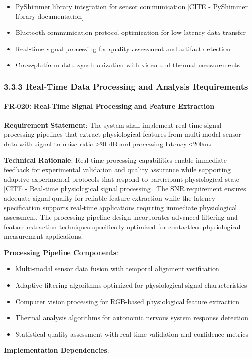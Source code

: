 \documentclass[12pt,a4paper]{article}
\begin{document}
\begin{itemize}
\item PyShimmer library integration for sensor communication [CITE - PyShimmer library documentation]
\item Bluetooth communication protocol optimization for low-latency data transfer
\item Real-time signal processing for quality assessment and artifact detection
\item Cross-platform data synchronization with video and thermal measurements

\end{itemize}
\subsubsection{3.3.3 Real-Time Data Processing and Analysis Requirements}

\paragraph{FR-020: Real-Time Signal Processing and Feature Extraction}

\textbf{Requirement Statement}: The system shall implement real-time signal processing pipelines that extract physiological
features from multi-modal sensor data with signal-to-noise ratio ≥20 dB and processing latency ≤200ms.

\textbf{Technical Rationale}: Real-time processing capabilities enable immediate feedback for experimental validation and
quality assurance while supporting adaptive experimental protocols that respond to participant physiological
state [CITE - Real-time physiological signal processing]. The SNR requirement ensures adequate signal quality for
reliable feature extraction while the latency specification supports real-time applications requiring immediate
physiological assessment. The processing pipeline design incorporates advanced filtering and feature extraction
techniques specifically optimized for contactless physiological measurement applications.

\textbf{Processing Pipeline Components}:

\begin{itemize}
\item Multi-modal sensor data fusion with temporal alignment verification
\item Adaptive filtering algorithms optimized for physiological signal characteristics
\item Computer vision processing for RGB-based physiological feature extraction
\item Thermal analysis algorithms for autonomic nervous system response detection
\item Statistical quality assessment with real-time validation and confidence metrics

\end{itemize}
\textbf{Implementation Dependencies}:
\end{document}
